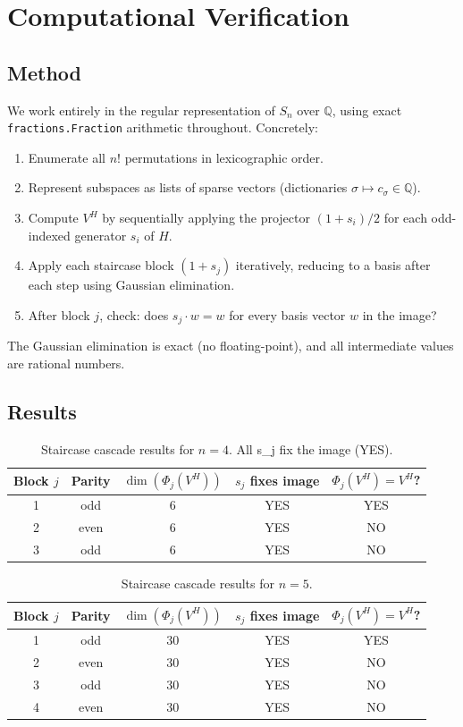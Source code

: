 \documentclass[12pt]{article}
\theoremstyle{definition}
\begin{document}
\section{Computational Verification}

\subsection{Method}

We work entirely in the regular representation of $S_n$ over $\mathbb{Q}$, using exact \texttt{fractions.Fraction} arithmetic throughout. Concretely:
\begin{enumerate}
  \item Enumerate all $n!$ permutations in lexicographic order.
  \item Represent subspaces as lists of sparse vectors (dictionaries $\sigma \mapsto c_\sigma \in \mathbb{Q}$).
  \item Compute $V^H$ by sequentially applying the projector $(1+s_i)/2$ for each odd-indexed generator $s_i$ of $H$.
  \item Apply each staircase block $(1+s_j)$ iteratively, reducing to a basis after each step using Gaussian elimination.
  \item After block $j$, check: does $s_j \cdot w = w$ for every basis vector $w$ in the image?
\end{enumerate}

The Gaussian elimination is exact (no floating-point), and all intermediate values are rational numbers.

\subsection{Results}

\begin{table}[h]
\centering
\caption{Staircase cascade results for $n=4$. All s\_j fix the image (YES).}
\begin{tabular}{ccccc}
\toprule
Block $j$ & Parity & $\dim(\Phi_j(V^H))$ & $s_j$ fixes image & $\Phi_j(V^H) = V^H$? \\
\midrule
1 & odd  & 6 & YES & YES \\
2 & even & 6 & YES & NO \\
3 & odd  & 6 & YES & NO \\
\bottomrule
\end{tabular}
\end{table}

\begin{table}[h]
\centering
\caption{Staircase cascade results for $n=5$.}
\begin{tabular}{ccccc}
\toprule
Block $j$ & Parity & $\dim(\Phi_j(V^H))$ & $s_j$ fixes image & $\Phi_j(V^H) = V^H$? \\
\midrule
1 & odd  & 30 & YES & YES \\
2 & even & 30 & YES & NO \\
3 & odd  & 30 & YES & NO \\
4 & even & 30 & YES & NO \\
\bottomrule
\end{tabular}
\end{table}
\end{document}
